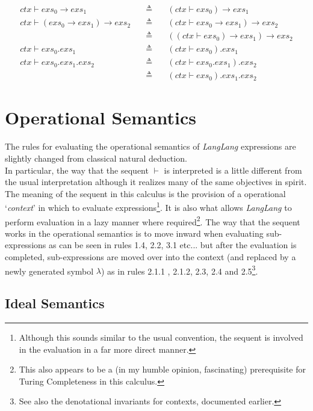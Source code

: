 \documentclass[a4paper,11pt]{article}
\begin{document}
\begin{eqnarray*}
ctx \vdash exs_0 \rightarrow exs_1 \quad&\triangleq&\quad (ctx \vdash exs_0) \rightarrow exs_1 \\
ctx \vdash (exs_0 \rightarrow exs_1) \rightarrow exs_2 \quad&\triangleq&\quad (ctx \vdash exs_0 \rightarrow exs_1) \rightarrow exs_2 \\
                                                            &\triangleq&\quad ((ctx \vdash exs_0) \rightarrow exs_1) \rightarrow exs_2 \\
ctx \vdash exs_0.exs_1 \quad&\triangleq&\quad (ctx \vdash exs_0).exs_1 \\
ctx \vdash exs_0.exs_1.exs_2 \quad&\triangleq&\quad (ctx \vdash exs_0.exs_1).exs_2 \\
                                  &\triangleq&\quad (ctx \vdash exs_0).exs_1.exs_2
\end{eqnarray*}

\section{Operational Semantics}
The rules for evaluating the operational semantics of \textsl{LangLang} expressions are slightly changed from classical natural deduction.\\

In particular, the way that the sequent $\vdash$ is interpreted is a little different from the usual interpretation although it realizes many of the same objectives in spirit.
The meaning of the sequent in this calculus is the provision of a operational `\emph{context}' in which to evaluate expressions\footnote{Although this sounds similar to the usual convention, the sequent is involved in the evaluation in a far more direct manner.}.
It is also what allows \textsl{LangLang} to perform evaluation in a lazy manner where required\footnote{This also appears to be a (in my humble opinion, fascinating) prerequisite for Turing Completeness in this calculus.}.
The way that the sequent works in the operational semantics is to move inward when evaluating sub-expressions as can be seen in rules 1.4, 2.2, 3.1 etc... but after the evaluation is completed, sub-expressions are moved over into the context (and replaced by a newly generated symbol $\lambda$) as in rules 2.1.1 , 2.1.2, 2.3, 2.4 and 2.5\footnote{See also the denotational invariants for contexts, documented earlier.}.

\subsection{Ideal Semantics}
\end{document}

